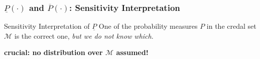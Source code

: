\documentclass{beamer}
\newcommand{\pr}{P}
\newcommand{\lpr}{\underline{P}}
\newcommand{\upr}{\overline{P}}
\newcommand{\lnex}{\underline{E}}
\begin{document}
\begin{frame}
  \frametitle{$\lpr(\cdot)$ and $\upr(\cdot)$: Sensitivity Interpretation}
  \begin{block}{Sensitivity Interpretation of $\lpr$}
    One of the probability measures $\pr$ in the credal set $\mathcal{M}$ is
    the correct one,
    \textit{but we do not know which}.
  \end{block}
  \begin{center}
    \textbf{crucial: no distribution over $\mathcal{M}$ assumed!} %
  \end{center}
\end{frame}
\fi %
\end{document}
